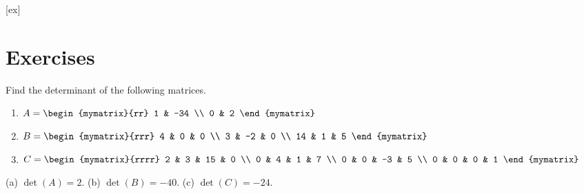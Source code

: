 [ex]
\section*{Exercises}

\begin{enumialphparenastyle}

\begin{ex}
  Find the determinant of the following matrices.

  \begin{enumerate}
  \item 
    $A = \begin{mymatrix}{rr}
      1 & -34 \\
      0 & 2 
    \end{mymatrix} $

  \item 
    $B = \begin{mymatrix}{rrr}
      4 & 0 &  0 \\
      3 & -2 & 0 \\
      14 & 1 & 5 
    \end{mymatrix}$

  \item 
    $C = \begin{mymatrix}{rrrr}
      2 & 3 & 15 & 0 \\
      0 & 4 & 1 & 7 \\
      0 & 0 & -3 & 5 \\
      0 & 0 & 0 & 1 
    \end{mymatrix}$
  \end{enumerate}

 \begin{sol}
   (a) $\det(A) = 2$. (b) $\det(B) = -40$. (c) $\det(C) = -24$.
 \end{sol}

\end{ex}

\end{enumialphparenastyle}
